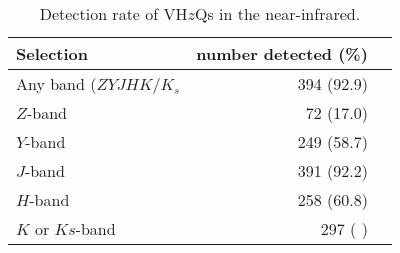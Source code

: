 \documentclass[usenatbib]{mnras}
\begin{document}
    \begin{table}
          \centering

      \begin{tabular}{l r l}
        \hline  \hline
        Selection   & number detected (\%) \\
        \hline  
        Any band ($ZYJHK/K_{s}$   &  394  (92.9) \\
        $Z$-band    &  72  (17.0) \\
        $Y$-band    &  249  (58.7) \\
        $J$-band    &  391  (92.2) \\
        $H$-band    &  258  (60.8) \\
        $K$ or $Ks$-band    &  297  ( ) \\
        \hline  \hline
      \end{tabular}
      \caption{Detection rate of VH$z$Qs in the near-infrared.}
      \label{tab:nir_detection}
    \end{table}
\end{document}
